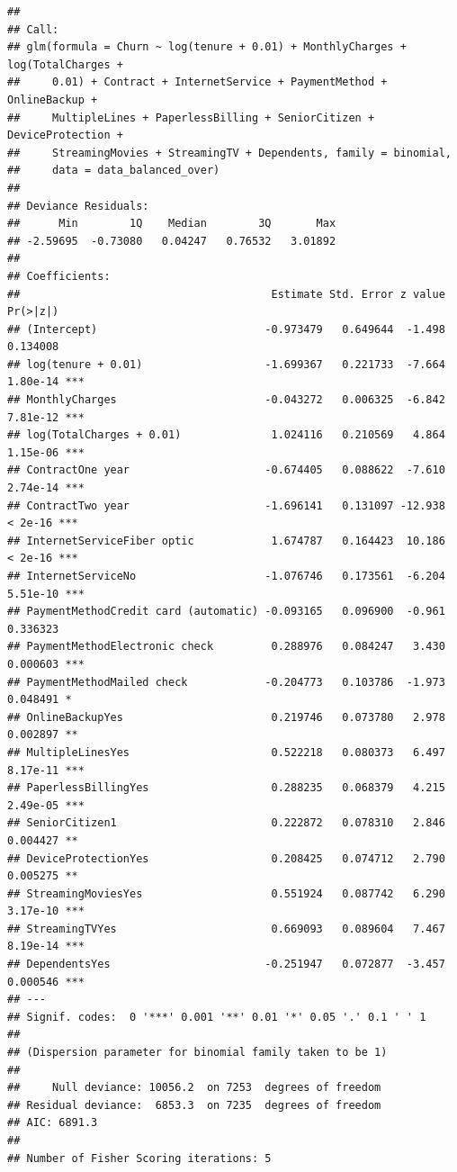 \documentclass[
  twoside]{article}
\begin{document}
\begin{verbatim}
## 
## Call:
## glm(formula = Churn ~ log(tenure + 0.01) + MonthlyCharges + log(TotalCharges + 
##     0.01) + Contract + InternetService + PaymentMethod + OnlineBackup + 
##     MultipleLines + PaperlessBilling + SeniorCitizen + DeviceProtection + 
##     StreamingMovies + StreamingTV + Dependents, family = binomial, 
##     data = data_balanced_over)
## 
## Deviance Residuals: 
##      Min        1Q    Median        3Q       Max  
## -2.59695  -0.73080   0.04247   0.76532   3.01892  
## 
## Coefficients:
##                                       Estimate Std. Error z value Pr(>|z|)    
## (Intercept)                          -0.973479   0.649644  -1.498 0.134008    
## log(tenure + 0.01)                   -1.699367   0.221733  -7.664 1.80e-14 ***
## MonthlyCharges                       -0.043272   0.006325  -6.842 7.81e-12 ***
## log(TotalCharges + 0.01)              1.024116   0.210569   4.864 1.15e-06 ***
## ContractOne year                     -0.674405   0.088622  -7.610 2.74e-14 ***
## ContractTwo year                     -1.696141   0.131097 -12.938  < 2e-16 ***
## InternetServiceFiber optic            1.674787   0.164423  10.186  < 2e-16 ***
## InternetServiceNo                    -1.076746   0.173561  -6.204 5.51e-10 ***
## PaymentMethodCredit card (automatic) -0.093165   0.096900  -0.961 0.336323    
## PaymentMethodElectronic check         0.288976   0.084247   3.430 0.000603 ***
## PaymentMethodMailed check            -0.204773   0.103786  -1.973 0.048491 *  
## OnlineBackupYes                       0.219746   0.073780   2.978 0.002897 ** 
## MultipleLinesYes                      0.522218   0.080373   6.497 8.17e-11 ***
## PaperlessBillingYes                   0.288235   0.068379   4.215 2.49e-05 ***
## SeniorCitizen1                        0.222872   0.078310   2.846 0.004427 ** 
## DeviceProtectionYes                   0.208425   0.074712   2.790 0.005275 ** 
## StreamingMoviesYes                    0.551924   0.087742   6.290 3.17e-10 ***
## StreamingTVYes                        0.669093   0.089604   7.467 8.19e-14 ***
## DependentsYes                        -0.251947   0.072877  -3.457 0.000546 ***
## ---
## Signif. codes:  0 '***' 0.001 '**' 0.01 '*' 0.05 '.' 0.1 ' ' 1
## 
## (Dispersion parameter for binomial family taken to be 1)
## 
##     Null deviance: 10056.2  on 7253  degrees of freedom
## Residual deviance:  6853.3  on 7235  degrees of freedom
## AIC: 6891.3
## 
## Number of Fisher Scoring iterations: 5
\end{verbatim}
\end{document}
